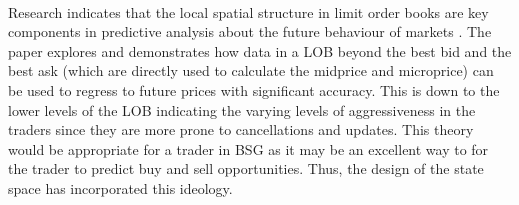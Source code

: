 \documentclass[ %
                    author={Ashwinder Khurana},
                supervisor={Prof Dave Cliff},
                    degree={MEng},
                     title={The Deeply Reinforced Trader},
                  subtitle={},
                      type={enterprise},
                      year={2020} ]{dissertation}
\begin{document}
{\\
Research indicates that the local spatial structure in limit order books are key components in predictive analysis about the future behaviour of markets \cite{Deep learning for limit order books paper in research folder}. The paper explores and demonstrates how data in a LOB beyond the best bid and the best ask (which are directly used to calculate the midprice and microprice) can be used to regress to future prices with significant accuracy. This is down to the lower levels of the LOB indicating the varying levels of aggressiveness in the traders since they are more prone to cancellations and updates. This  theory would be appropriate for a trader in BSG as it may be an excellent way to for the trader to predict buy and sell opportunities. Thus, the design of the state space has incorporated this ideology. 


}
\end{document}
